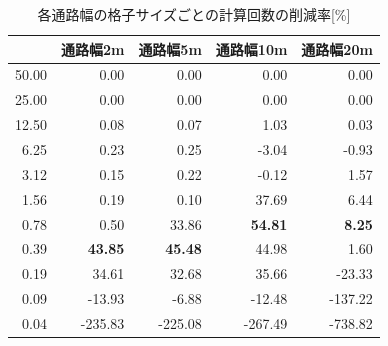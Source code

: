 %
\begin{table}[tb]
  \centering
  \caption{各通路幅の格子サイズごとの計算回数の削減率[\%]}
  \label{tb:5_times_sakugenritu}
    \begin{tabular}{r|r|r|r|r}
    \hline \hline
              & 通路幅2m       & 通路幅5m       & 通路幅10m      & 通路幅20m     \\ \hline
        50.00 & 0.00           & 0.00           & 0.00           & 0.00          \\ \hline
        25.00 & 0.00           & 0.00           & 0.00           & 0.00          \\ \hline
        12.50 & 0.08           & 0.07           & 1.03           & 0.03          \\ \hline
        6.25  & 0.23           & 0.25           & -3.04          & -0.93         \\ \hline
        3.12  & 0.15           & 0.22           & -0.12          & 1.57          \\ \hline
        1.56  & 0.19           & 0.10           & 37.69          & 6.44          \\ \hline
        0.78  & 0.50           & 33.86          & \textbf{54.81} & \textbf{8.25} \\ \hline
        0.39  & \textbf{43.85} & \textbf{45.48} & 44.98          & 1.60          \\ \hline
        0.19  & 34.61          & 32.68          & 35.66          & -23.33        \\ \hline
        0.09  & -13.93         & -6.88          & -12.48         & -137.22       \\ \hline
        0.04  & -235.83        & -225.08        & -267.49        & -738.82       \\ \hline
    \end{tabular}
\end{table}

